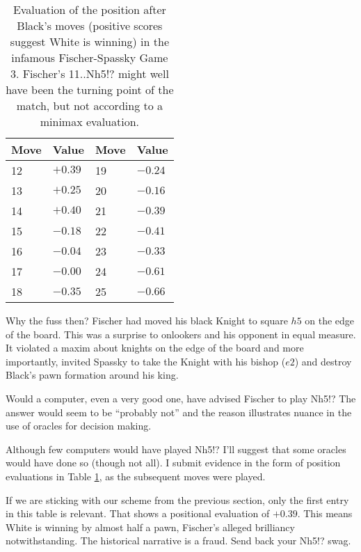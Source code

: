 \begin{table}
\centering
    \label{tab:stockfish}
    \begin{tabular}{|l|l|l|l|}
    \hline 
        Move & Value & Move & Value \\
    \hline 
        12 & $+0.39$ & 19 & $-0.24$ \\
        13 & $+0.25$ & 20 & $-0.16$ \\
        14 & $+0.40$ &  21 & $-0.39$ \\
        15 & $-0.18$ &     22 & $-0.41$ \\
        16 & $-0.04$ &   23 & $-0.33$ \\
        17 & $-0.00$ &  24 & $-0.61$ \\
        18 & $-0.35$ &   25 & $-0.66$ \\
        \hline 
    \end{tabular}
    \caption{Evaluation of the position after Black's moves (positive scores suggest White is winning) in the infamous Fischer-Spassky Game 3. Fischer's 11..Nh5!? might well have been the turning point of the match, but not according to a minimax evaluation.}
    \label{tab:eval}
\end{table}

Why the fuss then? Fischer had moved his black Knight to square $h5$ on the edge of the board. This was a surprise to onlookers and his opponent in equal measure. It violated a maxim about knights on the edge of the board and more importantly, invited Spassky to take the Knight with his bishop ($e2$) and destroy Black's pawn formation around his king. 

Would a computer, even a very good one, have advised Fischer to play Nh5!? The answer would seem to be ``probably not'' and the reason illustrates nuance in the use of oracles for decision making. 

Although few computers would have played Nh5!? I'll suggest that some oracles would have done so (though not all). I submit evidence in the form of position evaluations in Table \ref{tab:eval}, as the subsequent moves were played. 

If we are sticking with our scheme from the previous section, only the first entry in this table is relevant. That shows a positional evaluation of $+0.39$. This means White is winning by almost half a pawn, Fischer's alleged brilliancy notwithstanding. The historical narrative is a fraud. Send back your Nh5!? swag.  

